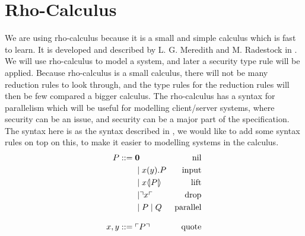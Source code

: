 \section{Rho-Calculus}
We are using rho-calculus because it is a small and simple calculus which is fast to learn.
It is developed and described by L. G. Meredith and M. Radestock in \citep{Meredith2005}.
We will use rho-calculus to model a system, and later a security type rule will be applied.
Because rho-calculus is a small calculus, there will not be many reduction rules to look through, and the type rules for the reduction rules will then be few compared a bigger calculus.
The rho-calculus has a syntax for parallelism which will be useful for modelling client/server systems, where security can be an issue, and security can be a major part of the specification. 
The syntax here is as the syntax described in \citep{Meredith2005}, we would like to add some syntax rules on top on this, to make it easier to modelling systems in the calculus.
\begin{align*}
    P  ::= \; &  \mathbf{0} & \text{nil} \\
      & \mid x(y).P & \text{input} \\
      & \mid x \langle \! | P | \! \rangle & \text{lift} \\
      & \mid \urcorner x \ulcorner & \text{drop} \\
      & \mid P \mid Q & \text{parallel} \\[3mm]
    x,y ::= \; & \ulcorner P \urcorner & \text{quote}\\
\end{align*}



